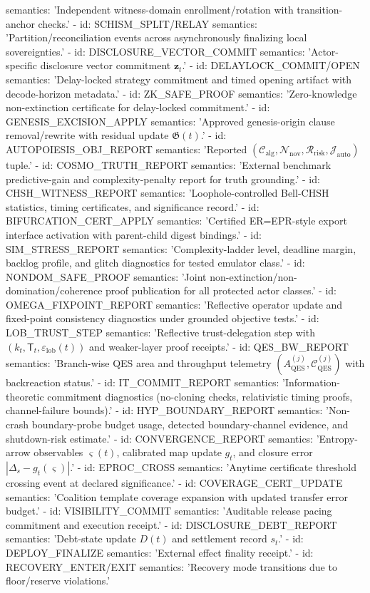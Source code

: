 \documentclass[11pt,a4paper]{article}
\newcommand{\eps}{\varepsilon}
\theoremstyle{definition}
\theoremstyle{remark}
\begin{document}
\begin{YAMLtiny}
    semantics: 'Independent witness-domain enrollment/rotation with transition-anchor checks.'
  - id: SCHISM\_SPLIT/RELAY
    semantics: 'Partition/reconciliation events across asynchronously finalizing local sovereignties.'
  - id: DISCLOSURE\_VECTOR\_COMMIT
    semantics: 'Actor-specific disclosure vector commitment $\bm z_t$.'
  - id: DELAYLOCK\_COMMIT/OPEN
    semantics: 'Delay-locked strategy commitment and timed opening artifact with decode-horizon metadata.'
  - id: ZK\_SAFE\_PROOF
    semantics: 'Zero-knowledge non-extinction certificate for delay-locked commitment.'
  - id: GENESIS\_EXCISION\_APPLY
    semantics: 'Approved genesis-origin clause removal/rewrite with residual update $\mathfrak G(t)$.'
  - id: AUTOPOIESIS\_OBJ\_REPORT
    semantics: 'Reported $(\mathcal C_{\mathrm{alg}},\mathcal N_{\mathrm{nov}},\mathcal R_{\mathrm{risk}},\mathcal J_{\mathrm{auto}})$ tuple.'
  - id: COSMO\_TRUTH\_REPORT
    semantics: 'External benchmark predictive-gain and complexity-penalty report for truth grounding.'
  - id: CHSH\_WITNESS\_REPORT
    semantics: 'Loophole-controlled Bell-CHSH statistics, timing certificates, and significance record.'
  - id: BIFURCATION\_CERT\_APPLY
    semantics: 'Certified ER=EPR-style export interface activation with parent-child digest bindings.'
  - id: SIM\_STRESS\_REPORT
    semantics: 'Complexity-ladder level, deadline margin, backlog profile, and glitch diagnostics for tested emulator class.'
  - id: NONDOM\_SAFE\_PROOF
    semantics: 'Joint non-extinction/non-domination/coherence proof publication for all protected actor classes.'
  - id: OMEGA\_FIXPOINT\_REPORT
    semantics: 'Reflective operator update and fixed-point consistency diagnostics under grounded objective tests.'
  - id: LOB\_TRUST\_STEP
    semantics: 'Reflective trust-delegation step with $(k_t,\mathsf T_t,\eps_{\mathrm{lob}}(t))$ and weaker-layer proof receipts.'
  - id: QES\_BW\_REPORT
    semantics: 'Branch-wise QES area and throughput telemetry $(A_{\mathrm{QES}}^{(j)},\mathcal C_{\mathrm{QES}}^{(j)})$ with backreaction status.'
  - id: IT\_COMMIT\_REPORT
    semantics: 'Information-theoretic commitment diagnostics (no-cloning checks, relativistic timing proofs, channel-failure bounds).'
  - id: HYP\_BOUNDARY\_REPORT
    semantics: 'Non-crash boundary-probe budget usage, detected boundary-channel evidence, and shutdown-risk estimate.'
  - id: CONVERGENCE\_REPORT
    semantics: 'Entropy-arrow observables $\varsigma(t)$, calibrated map update $g_t$, and closure error $|\Delta_s-g_t(\varsigma)|$.'
  - id: EPROC\_CROSS
    semantics: 'Anytime certificate threshold crossing event at declared significance.'
  - id: COVERAGE\_CERT\_UPDATE
    semantics: 'Coalition template coverage expansion with updated transfer error budget.'
  - id: VISIBILITY\_COMMIT
    semantics: 'Auditable release pacing commitment and execution receipt.'
  - id: DISCLOSURE\_DEBT\_REPORT
    semantics: 'Debt-state update $D(t)$ and settlement record $s_t$.'
  - id: DEPLOY\_FINALIZE
    semantics: 'External effect finality receipt.'
  - id: RECOVERY\_ENTER/EXIT
    semantics: 'Recovery mode transitions due to floor/reserve violations.'
\end{YAMLtiny}
\end{document}

